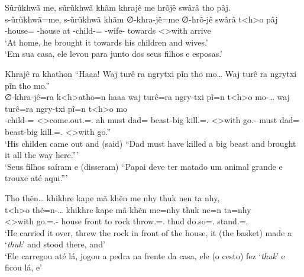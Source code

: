 \documentclass[output=paper,
modfonts,nonflat
]{langsci/langscibook}
\begin{document}
\ea  Sũrũkhwã me, sũrũkhwã khãm khrajê me hrõjê swârâ tho pâj. \\[.3em]
\gll s-ũrũkhwã=me,\footnotemark{} s-ũrũkhwã    khãm ∅-khra-jê=me              ∅-hrõ-jê          swârâ   t<h>o        pâj    \\
     \Third-house=\AAnd{}          \Third-house at   \Third-child-\Pl{}=\AAnd{} \Third-wife-\Pl{} towards <\Third>with arrive \\
\glt `At home, he brought it towards his children and wives.' \\
     `Em sua casa, ele levou para junto dos seus filhos e esposas.' \\
\z

\ea  Khrajê ra khathon ``Haaa! Waj turê ra ngrytxi pĩn tho mo\ldots{} Waj turê ra ngrytxi pĩn tho mo.'' \\[.3em]
\gll ∅-khra-jê=ra              k<h>atho=n                      haaa waj  turê=ra    ngry-txi  pĩ=n                t<h>o        mo-\ldots{}       waj  turê=ra    ngry-txi  pĩ=n                t<h>o        mo       \\
     \Third-child-\Pl{}=\Nom{} <\Third>come.out.\Sg=\AAnd.\Ss{} ah   must dad=\Nom{} beast-big kill.\Sg=\AAnd.\Ss{} <\Third>with go.\Pl{}-\Ints{} must dad=\Nom{} beast-big kill.\Sg=\AAnd.\Ss{} <\Third>with go.\Pl'' \\
\glt `His childen came out and (said) ``Dad must have killed a big beast and brought it all the way here.''{}' \\
     `Seus filhos saíram e (disseram) ``Papai deve ter matado um animal grande e trouxe até aqui.''{}' \\
\label{exe:wajpripos}
\z

\ea  Tho thẽn\ldots{} khikhre kape mã khẽn me nhy thuk nen ta nhy, \\[.3em]
\gll t<h>o        thẽ=n-\ldots{}             khikhre kape  mã khẽn me=nhy                 thuk ne=n             ta=nhy                 \\
     <\Third>with go.\Sg=\AAnd.\Ss{}-\Ints{} house   front to rock throw.\Sg{}=\AAnd.\Ds{} thud do.so=\AAnd.\Ss{} stand.\Sg{}=\AAnd.\Ds{} \\
\glt `He carried it over, threw the rock in front of the house, it (the basket) made a `\textit{thuk}' and stood there, and' \\
     `Ele carregou até lá, jogou a pedra na frente da casa, ele (o cesto) fez `\textit{thuk}' e ficou lá, e' \\
\z
\end{document}
